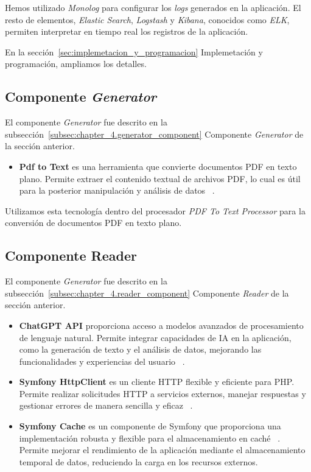 Hemos utilizado \textit{Monolog} para configurar los \textit{logs} generados en la aplicación.
El resto de elementos, \textit{Elastic Search}, \textit{Logstash} y \textit{Kibana}, conocidos como \textit{ELK},
permiten interpretar en tiempo real los registros de la aplicación.

En la sección~\ref{sec:implemetacion_y_programacion} Implemetación y programación, ampliamos los detalles.

\subsection*{Componente \textit{Generator}}

El componente \textit{Generator} fue descrito en la subsección~\ref{subsec:chapter_4.generator_component} Componente
\textit{Generator} de la sección anterior.

\begin{itemize}
    \item \textbf{Pdf to Text} es una herramienta que convierte documentos PDF en texto plano.
    Permite extraer el contenido textual de archivos PDF, lo cual es útil para la posterior manipulación y análisis de
    datos ~\cite{url_pdftotextl}.
\end{itemize}

Utilizamos esta tecnología dentro del procesador \textit{PDF To Text Processor} para la conversión de documentos PDF en
texto plano.

\subsection*{Componente Reader}

El componente \textit{Generator} fue descrito en la subsección~\ref{subsec:chapter_4.reader_component} Componente
\textit{Reader} de la sección anterior.

\begin{itemize}
    \item \textbf{ChatGPT API} proporciona acceso a modelos avanzados de procesamiento de lenguaje natural.
    Permite integrar capacidades de IA en la aplicación, como la generación de texto y el análisis de datos, mejorando
    las funcionalidades y experiencias del usuario ~\cite{url_chatgpt_api}.
    \item \textbf{Symfony HttpClient} es un cliente HTTP flexible y eficiente para PHP. Permite realizar solicitudes
    HTTP a servicios externos, manejar respuestas y gestionar errores de manera sencilla y eficaz
    ~\cite{url_symfony_http}.
    \item \textbf{Symfony Cache} es un componente de Symfony que proporciona una implementación robusta y flexible
    para el almacenamiento en caché ~\cite{url_symfony_cache}.
    Permite mejorar el rendimiento de la aplicación mediante el almacenamiento temporal de datos, reduciendo la carga en
    los recursos externos.
\end{itemize}

